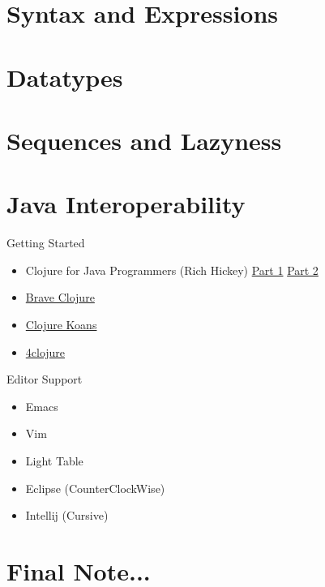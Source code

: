 \documentclass[10pt, compress]{beamer}
\begin{document}

\section{Syntax and Expressions}

\section{Datatypes}

\section{Sequences and Lazyness}

\section{Java Interoperability}

\begin{frame}{Getting Started}
  \begin{itemize}
    \item Clojure for Java Programmers (Rich Hickey)
      \href{https://www.youtube.com/watch?v=P76Vbsk_3J0}{Part 1}
      \href{https://www.youtube.com/watch?v=hb3rurFxrZ8}{Part 2}
    \item \href{http://www.braveclojure.com/}{Brave Clojure}
    \item \href{http://clojurekoans.com/}{Clojure Koans}
    \item \href{https://www.4clojure.com/}{4clojure}
  \end{itemize}
\end{frame}

\begin{frame}{Editor Support}
  \begin{itemize}
    \item Emacs
    \item Vim
    \item Light Table
    \item Eclipse (CounterClockWise)
    \item Intellij (Cursive)
  \end{itemize}
\end{frame}

\section{Final Note...}
\end{document}
